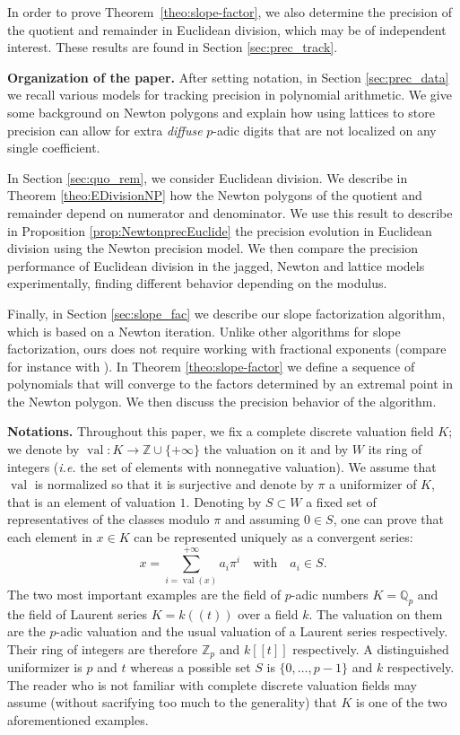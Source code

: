 \documentclass{sig-alternate-05-2015}
\DeclareMathOperator{\val}{val}
\newcommand{\Z}{\mathbb Z}
\newcommand{\Zp}{\Z_p}
\newcommand{\Q}{\mathbb Q}
\newcommand{\Qp}{\Q_p}
\theoremstyle{definition}
\begin{document}
In order to prove Theorem~\ref{theo:slope-factor}, we also determine
the precision of the quotient and remainder in Euclidean division,
which may be of independent interest.  These results are found in
Section \ref{sec:prec_track}.

\medskip

\noindent
{\bf Organization of the paper.}
%
After setting notation, in
Section \ref{sec:prec_data} we recall various models for tracking
precision in polynomial arithmetic.  We give some background
on Newton polygons and explain how using lattices to store
precision can allow for extra \emph{diffuse} $p$-adic digits that
are not localized on any single coefficient.

In Section \ref{sec:quo_rem}, we consider Euclidean division.
We describe in Theorem \ref{theo:EDivisionNP}
how the Newton polygons of the quotient and remainder
depend on numerator and denominator.  We use this
result to describe in Proposition \ref{prop:NewtonprecEuclide}
the precision evolution in Euclidean division using
the Newton precision model.  We then compare the
precision performance of Euclidean division in the
jagged, Newton and lattice models experimentally,
finding different behavior depending on the modulus.

Finally, in Section \ref{sec:slope_fac} we describe
our slope factorization algorithm, which is based on
a Newton iteration.  Unlike other algorithms for
slope factorization, ours does not require working
with fractional exponents (compare for instance with
\cite[\S~6]{poteaux-rybowicz}).
In Theorem \ref{theo:slope-factor} we define a sequence
of polynomials that will converge to the factors
determined by an extremal point in the Newton
polygon.  We then discuss the precision behavior
of the algorithm.

\medskip

\noindent
{\bf Notations.}
Throughout this paper, we fix a complete discrete valuation field $K$; 
we denote by $\val : K \to \Z \cup \{+\infty\}$ the valuation on it and 
by $W$ its ring of integers (\emph{i.e.} the set of elements with 
nonnegative valuation). We assume that $\val$ is normalized so that it
is surjective and denote by $\pi$ a uniformizer of $K$, that is an 
element of valuation $1$. Denoting by $S \subset W$ a fixed set of 
representatives of the classes modulo $\pi$ and assuming $0 \in S$, 
one can prove that each element in $x \in K$ can be represented 
uniquely as a convergent series:
\begin{equation}
\label{eq:CDVFseries}
x = \sum_{i=\val(x)}^{+\infty} a_i \pi^i
\quad \text{with} \quad a_i \in S.
\end{equation}
The two most important examples are the field of $p$-adic numbers $K = 
\Qp$ and the field of Laurent series $K = k((t))$ over a field $k$. The 
valuation on them are the $p$-adic valuation and the usual valuation of 
a Laurent series respectively. Their ring of integers are therefore 
$\Zp$ and $k[[t]]$ respectively. A distinguished uniformizer is $p$ 
and $t$ whereas a possible set $S$ is $\{0, \ldots, p-1\}$ and $k$
respectively.
The reader who is not familiar with complete discrete valuation fields
may assume (without sacrifying too much to the generality) that $K$ is
one of the two aforementioned examples.
\end{document}
